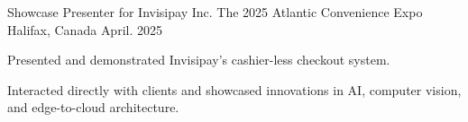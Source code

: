 

\begin{cventries}

  \cventry
    {Showcase Presenter for Invisipay Inc.} %
    {The 2025 Atlantic Convenience Expo} %
    {Halifax, Canada} %
    {April. 2025} %
    {
      \begin{cvitems} %
        \item {Presented and demonstrated Invisipay's cashier-less checkout system.}
        \item {Interacted directly with clients and showcased innovations in AI, computer vision, and edge-to-cloud architecture.}
      \end{cvitems}
    }

\end{cventries}

